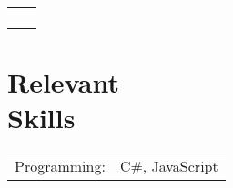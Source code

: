 \documentclass[margin,line,pifont,palatino,courier]{res}
\newenvironment{list1}{
  \begin{list}{\ding{113}}{%
      \setlength{\itemsep}{0in}
      \setlength{\parsep}{0in} \setlength{\parskip}{0in}
      \setlength{\topsep}{0in} \setlength{\partopsep}{0in}
      \setlength{\leftmargin}{0.17in}}}{\end{list}}
\begin{document}
\begin{resume}
\begin{tabular}{@{}p{2.3in}p{3in}}
\begin{list1}
\end{list1}

\end{tabular}







\section{\sc Relevant \\ Skills}

\begin{tabular}{@{}p{0.8in}p{6in}}

Programming:& C\#, JavaScript\\

\end{tabular}




\end{resume}
\end{document}

